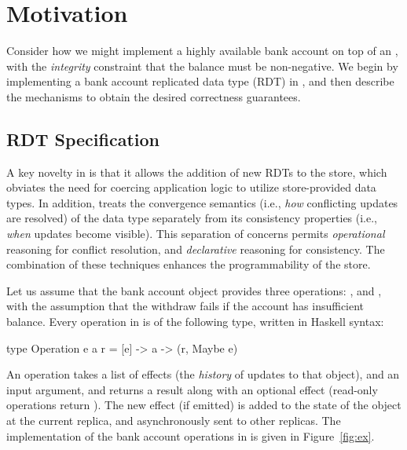 \section{Motivation}
\label{sec:motivation}

Consider how we might implement a highly available bank account on top of an
\ecds, with the \emph{integrity} constraint that the balance must be
non-negative. We begin by implementing a bank account replicated data type
(RDT) in \name, and then describe the mechanisms to obtain the desired
correctness guarantees.

\subsection{RDT Specification}

A key novelty in \name is that it allows the addition of new RDTs to the
store, which obviates the need for coercing application logic to utilize
store-provided data types. In addition, \name treats the convergence
semantics (i.e., \emph{how} conflicting updates are resolved) of the data
type separately from its consistency properties (i.e., \emph{when} updates
become visible). This separation of concerns permits \emph{operational}
reasoning for conflict resolution, and \emph{declarative} reasoning for
consistency. The combination of these techniques enhances the
programmability of the store.

Let us assume that the bank account object provides three operations:
,  and , with the assumption that the
withdraw fails if the account has insufficient balance. Every operation in
\name is of the following type, written in Haskell syntax:

\begin{codehaskell}
type Operation e a r = [e] -> a -> (r, Maybe e)
\end{codehaskell}

\noindent An operation takes a list of effects (the \emph{history} of updates to that
object), and an input argument, and returns a result along with an optional
effect (read-only operations return ). The new effect (if emitted)
is added to the state of the object at the current replica, and asynchronously
sent to other replicas. The implementation of the bank account operations in
\name is given in Figure~\ref{fig:ex}.

